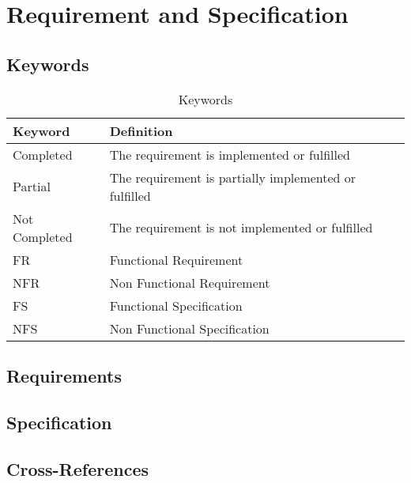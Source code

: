 \clearpage
\section{Requirement and Specification}
\subsection{Keywords}
\begin{table}[ht]
\centering

\begin{tabular}{ll}
\toprule
Keyword  & Definition \\

\midrule
Completed & The requirement is implemented or fulfilled \\
Partial & The requirement is partially implemented or fulfilled \\
Not Completed & The requirement is not implemented or fulfilled \\
FR & Functional Requirement \\
NFR & Non Functional Requirement \\
FS & Functional Specification \\
NFS & Non Functional Specification\\

\bottomrule

\end{tabular}
\caption{Keywords} \label{tbl:keywords}
\end{table}

\subsection{Requirements}
\lipsum[2]

\subsection{Specification}
\lipsum[1]

\subsection{Cross-References} 

\lipsum[5-7]